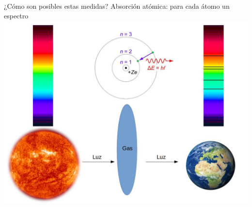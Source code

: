 \documentclass[handout]{beamer}
\begin{document}
\begin{frame}{¿Cómo son posibles estas medidas?}
	Absorción atómica: para cada átomo un espectro
	\includegraphics[height = 0.7\textheight]{sources/images/emission}
\end{frame}
\end{document}
